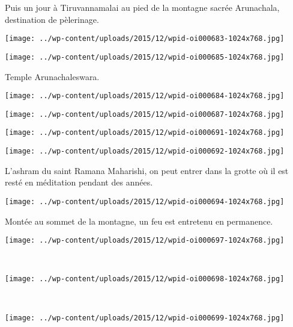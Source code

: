 Puis un jour à Tiruvannamalai au pied de la montagne sacrée Arunachala, destination de pèlerinage. 
\begin{center} \texttt{[image: ../wp-content/uploads/2015/12/wpid-oi000683-1024x768.jpg]} \end{center}
\begin{center} \texttt{[image: ../wp-content/uploads/2015/12/wpid-oi000685-1024x768.jpg]} \end{center}

Temple Arunachaleswara.
\begin{center} \texttt{[image: ../wp-content/uploads/2015/12/wpid-oi000684-1024x768.jpg]} \end{center}
\begin{center} \texttt{[image: ../wp-content/uploads/2015/12/wpid-oi000687-1024x768.jpg]} \end{center}
\begin{center} \texttt{[image: ../wp-content/uploads/2015/12/wpid-oi000691-1024x768.jpg]} \end{center}
\begin{center} \texttt{[image: ../wp-content/uploads/2015/12/wpid-oi000692-1024x768.jpg]} \end{center}

L'ashram du saint Ramana Maharishi, on peut entrer dans la grotte où il est resté en méditation pendant des années. 
\begin{center} \texttt{[image: ../wp-content/uploads/2015/12/wpid-oi000694-1024x768.jpg]} \end{center}
\vspace{-\topsep}
\pagebreak

Montée au sommet de la montagne, un feu est entretenu en permanence. 
\begin{center} \texttt{[image: ../wp-content/uploads/2015/12/wpid-oi000697-1024x768.jpg]} \end{center}
~\\
\begin{center} \texttt{[image: ../wp-content/uploads/2015/12/wpid-oi000698-1024x768.jpg]} \end{center}
\vspace{-\topsep}
\pagebreak

~
\begin{center} \texttt{[image: ../wp-content/uploads/2015/12/wpid-oi000699-1024x768.jpg]} \end{center}

